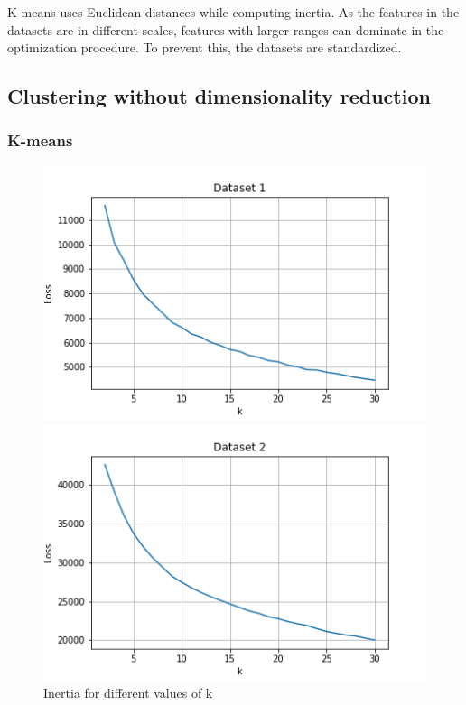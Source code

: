 \documentclass[letterpaper]{article}
\begin{document}
	K-means uses Euclidean distances while computing inertia. As the features in the datasets are in different scales, features with larger ranges can dominate in the optimization procedure. To prevent this, the datasets are standardized.

	\subsection{Clustering without dimensionality reduction}
	\subsubsection{K-means}
		\begin{figure}
		\centering
		\begin{minipage}{.5\textwidth}
			\centering
			\includegraphics[width=\linewidth]{../../plots/kmeans_loss_1}
		\end{minipage}%
		\begin{minipage}{.5\textwidth}
			\centering
			\includegraphics[width=\linewidth]{../../plots/kmeans_loss_2}
		\end{minipage}
		\caption{Inertia for different values of k}
		\label{fig:kmeans_losses}%
	\end{figure}%
\end{document}
